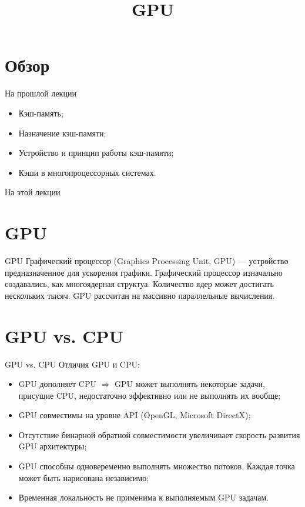 

\title{GPU}



\begin{frame}
\titlepage
\end{frame}

\section*{Обзор}

\begin{frame}{На прошлой лекции}
\begin{itemize}
\ifsbertech
    \item Кэш-память;
    \item Назначение кэш-памяти;
    \item Устройство и принцип работы кэш-памяти;
    \item Кэши в многопроцессорных системах.
\fi
\end{itemize}
\end{frame}

\begin{frame}{На этой лекции}
\tableofcontents
\end{frame}

\section{GPU}

\begin{frame}{GPU}
Графический процессор (\abbr Graphics Processing Unit, GPU) --- устройство
предназначенное для ускорения графики.
\vfill
Графический процессор изначально создавались, как многоядерная структуа.
Количество ядер может достигать нескольких тысяч.
\vfill
GPU рассчитан на массивно параллельные вычисления.
\end{frame}

\section{GPU vs. CPU}

\begin{frame}{GPU vs. CPU}
Отличия GPU и CPU:
\begin{itemize}
    \item GPU дополняет CPU $\Rightarrow$ GPU может выполнять некоторые задачи,
    присущие CPU, недостаточно эффективно или не выполнять их вообще;\pause
    \item GPU совместимы на уровне API (OpenGL, Microsoft DirectX);\pause
    \item Отсутствие бинарной обратной совместимости увеличивает скорость
    развития GPU архитектуры;\pause
    \item GPU способны одновеременно выполнять множество потоков. Каждая точка
    может быть нарисована независимо;\pause
    \item Временная локальность не применима к выполняемым GPU задачам.
\end{itemize}
\end{frame}

